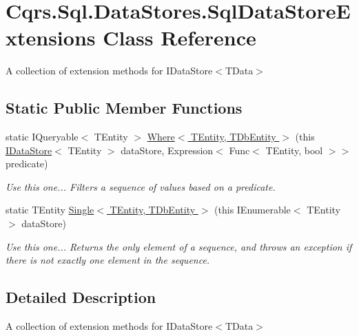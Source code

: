 \hypertarget{classCqrs_1_1Sql_1_1DataStores_1_1SqlDataStoreExtensions}{}\section{Cqrs.\+Sql.\+Data\+Stores.\+Sql\+Data\+Store\+Extensions Class Reference}
\label{classCqrs_1_1Sql_1_1DataStores_1_1SqlDataStoreExtensions}


A collection of extension methods for I\+Data\+Store$<$\+T\+Data$>$  


\subsection*{Static Public Member Functions}
\begin{DoxyCompactItemize}
\item 
static I\+Queryable$<$ T\+Entity $>$ \hyperlink{classCqrs_1_1Sql_1_1DataStores_1_1SqlDataStoreExtensions_a77e339885a9e26ff6bcf5b5bbe24b19d_a77e339885a9e26ff6bcf5b5bbe24b19d}{Where$<$ T\+Entity, T\+Db\+Entity $>$} (this \hyperlink{interfaceCqrs_1_1DataStores_1_1IDataStore}{I\+Data\+Store}$<$ T\+Entity $>$ data\+Store, Expression$<$ Func$<$ T\+Entity, bool $>$$>$ predicate)
\begin{DoxyCompactList}\small\item\em Use this one... Filters a sequence of values based on a predicate. \end{DoxyCompactList}\item 
static T\+Entity \hyperlink{classCqrs_1_1Sql_1_1DataStores_1_1SqlDataStoreExtensions_aff2943b536ef4fa182ce8b5194d65d86_aff2943b536ef4fa182ce8b5194d65d86}{Single$<$ T\+Entity, T\+Db\+Entity $>$} (this I\+Enumerable$<$ T\+Entity $>$ data\+Store)
\begin{DoxyCompactList}\small\item\em Use this one... Returns the only element of a sequence, and throws an exception if there is not exactly one element in the sequence. \end{DoxyCompactList}\end{DoxyCompactItemize}


\subsection{Detailed Description}
A collection of extension methods for I\+Data\+Store$<$\+T\+Data$>$ 



